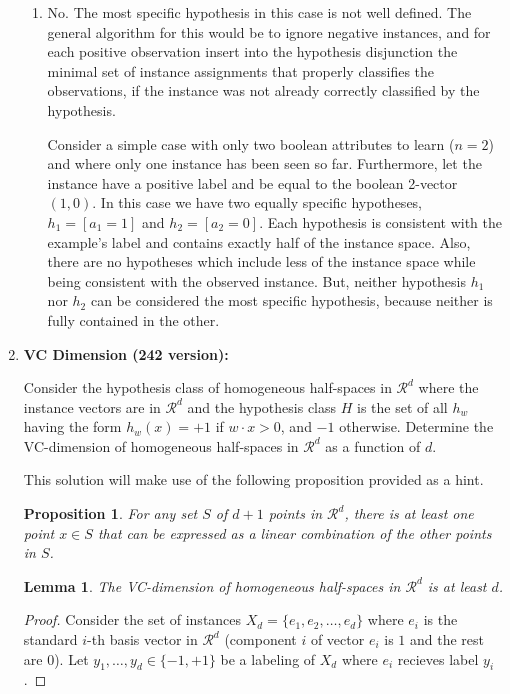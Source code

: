 \documentclass[12pt]{article}
\newtheorem{lemma}{Lemma}[section]
\newtheorem{proposition}{Proposition}[section]
\begin{document}
\begin{enumerate}
\begin{enumerate}
\item No. The most specific hypothesis in this case is not well defined.
The general algorithm for this would be to ignore negative instances,
and for each positive observation insert into the hypothesis disjunction
the minimal set of instance assignments that properly classifies the
observations, if the instance was not already correctly classified by the
hypothesis.

Consider a simple case with only two boolean attributes to learn ($n=2$)
and where only one instance has been seen so far.
Furthermore, let the instance have a positive label and be equal to the
boolean 2-vector $(1,0)$.
In this case we have two equally specific hypotheses,
$h_{1}=\left[a_{1}=1\right]$ and $h_{2}=\left[a_{2}=0\right]$.
Each hypothesis is consistent with the example's label and contains exactly
half of the instance space.
Also, there are no hypotheses which include less of the instance space while
being consistent with the observed instance.
But, neither hypothesis $h_1$ nor $h_2$ can be considered the most specific
hypothesis, because neither is fully contained in the other.
\end{enumerate}


\item \textbf{VC Dimension (242 version): }

Consider the hypothesis class of homogeneous half-spaces in $\mathcal{R}^d$ where the instance vectors are in $\mathcal{R}^d$ and the hypothesis class $H$ is the set of all $h_w$ having the form $h_w(x) = +1$ if $w \cdot x > 0$, and $-1$ otherwise.
Determine the VC-dimension of homogeneous half-spaces in $\mathcal{R}^d$ as a function of $d$.

This solution will make use of the following proposition provided as a hint.
\begin{proposition}
    \label{prop:lin-comb}
    For any set $S$ of $d+1$ points in $\mathcal{R}^d$, there is at least one point $x \in S$ that can be expressed as a linear combination of the other points in $S$.
\end{proposition}

\begin{lemma}
    The VC-dimension of homogeneous half-spaces in $\mathcal{R}^d$ is at least $d$.
\end{lemma}

\begin{proof}
    Consider the set of instances $X_d = \{e_1, e_2, \dots, e_d\}$ where $e_i$ is the standard $i$-th basis vector in $\mathcal{R}^d$ (component $i$ of vector $e_i$ is $1$ and the rest are $0$).
    Let $y_1, \dots, y_d \in \{-1,+1\}$ be a labeling of $X_d$ where $e_i$ recieves label $y_i$.


\end{proof}
\end{enumerate}
\end{document}
